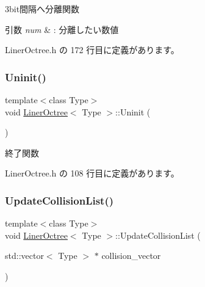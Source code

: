 3bit間隔へ分離関数 


\begin{DoxyParams}{引数}
{\em num} & \+: 分離したい数値 \\
\hline
\end{DoxyParams}


 Liner\+Octree.\+h の 172 行目に定義があります。

\mbox{\label{class_liner_octree_a86b5b9bc86630644e84508ff385cda69}} 
\subsubsection{\texorpdfstring{Uninit()}{Uninit()}}
{\footnotesize\ttfamily template$<$class Type$>$ \\
void \mbox{\hyperlink{class_liner_octree}{Liner\+Octree}}$<$ Type $>$\+::Uninit (\begin{DoxyParamCaption}{ }\end{DoxyParamCaption})\hspace{0.3cm}{\ttfamily [inline]}}



終了関数 



 Liner\+Octree.\+h の 108 行目に定義があります。

\mbox{\label{class_liner_octree_a880276cc9099c29f447f3ca0043b9ce9}} 
\subsubsection{\texorpdfstring{Update\+Collision\+List()}{UpdateCollisionList()}}
{\footnotesize\ttfamily template$<$class Type$>$ \\
void \mbox{\hyperlink{class_liner_octree}{Liner\+Octree}}$<$ Type $>$\+::Update\+Collision\+List (\begin{DoxyParamCaption}\item[{std\+::vector$<$ Type $>$ $\ast$}]{collision\+\_\+vector }\end{DoxyParamCaption})\hspace{0.3cm}{\ttfamily [inline]}}



